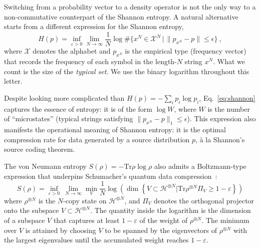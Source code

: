 \documentclass[aps,pre,twocolumn,superscriptaddress,amsmath,amssymb,reprint]{revtex4-2}
\def\eps{\varepsilon}
\newcommand*{\Tr}{\mathrm{Tr}}
\begin{document}
Switching from a probability vector to a density operator is not the only way to a non-commutative counterpart of the Shannon entropy. A natural alternative starts from a different expression for the Shannon entropy,
\begin{equation}\label{eq:shannon}
    H({p})=\inf_{\eps>0}\lim_{N\to\infty}\frac1N\log \#\{ x^N\in \mathcal{X}^N \, \big\vert\, \| p_{x^N}-{p}\|\le\epsilon \}\ ,
\end{equation}
where $\mathcal{X}$ denotes the alphabet and $ p_{x^N}$ is the empirical type (frequency vector) that records the frequency of each symbol in the length-$N$ string $x^N$. What we count is the size of the \emph{typical set}. We use the binary logarithm throughout this letter.  

Despite looking more complicated than $H( p)=-\sum_i p_i\log p_i$, Eq.~\eqref{eq:shannon} captures the essence of entropy: it is of the form $\log W$, where $W$ is the number of ``microstates'' (typical strings satisfying $\| p_{x^N}-{p}\|_1\le\epsilon$). This expression also manifests the operational meaning of Shannon entropy: it is the optimal compression rate for data generated by a source distribution $ p$, \`a la Shannon's source coding theorem.

The von Neumann entropy $S(\rho) = -\Tr \rho\log \rho$ also admits a Boltzmann-type expression that underpins Schumacher's quantum data compression~\cite{schumacher1995quantum}:
\begin{equation}\label{eq:vN}
S(\rho)
=\inf_{\eps>0}\ \lim_{N\to\infty}\min_V \frac1N
\log\!\left(
\dim\left\{V\subset \mathcal H^{\otimes N} | \Tr\rho^{\otimes N}\Pi_V\ge 1-\eps\right\}
\right)
\end{equation}
where $\rho^{\otimes N}$ is the $N$-copy state on $\mathcal H^{\otimes N}$, and $\Pi_V$ denotes the
orthogonal projector onto the subspace $V\subset \mathcal H^{\otimes N}$.
The quantity inside the logarithm is the dimension of a subspace $V$ that captures
at least $1-\eps$ of the weight of $\rho^{\otimes N}$. The minimum over $V$ is attained by choosing $V$ to be spanned by the eigenvectors of $\rho^{\otimes N}$ with the largest eigenvalues until the accumulated weight reaches $1-\eps$. 
\end{document}
